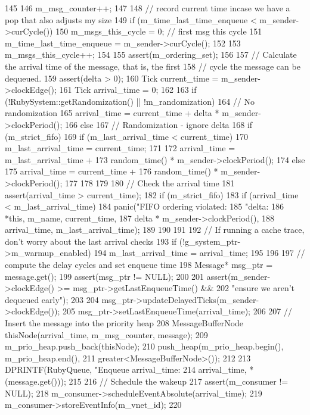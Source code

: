 \begin{DoxyCode}
145 {
146     m_msg_counter++;
147 
148     // record current time incase we have a pop that also adjusts my size
149     if (m_time_last_time_enqueue < m_sender->curCycle()) {
150         m_msgs_this_cycle = 0;  // first msg this cycle
151         m_time_last_time_enqueue = m_sender->curCycle();
152     }
153     m_msgs_this_cycle++;
154 
155     assert(m_ordering_set);
156 
157     // Calculate the arrival time of the message, that is, the first
158     // cycle the message can be dequeued.
159     assert(delta > 0);
160     Tick current_time = m_sender->clockEdge();
161     Tick arrival_time = 0;
162 
163     if (!RubySystem::getRandomization() || !m_randomization) {
164         // No randomization
165         arrival_time = current_time + delta * m_sender->clockPeriod();
166     } else {
167         // Randomization - ignore delta
168         if (m_strict_fifo) {
169             if (m_last_arrival_time < current_time) {
170                 m_last_arrival_time = current_time;
171             }
172             arrival_time = m_last_arrival_time +
173                            random_time() * m_sender->clockPeriod();
174         } else {
175             arrival_time = current_time +
176                            random_time() * m_sender->clockPeriod();
177         }
178     }
179 
180     // Check the arrival time
181     assert(arrival_time > current_time);
182     if (m_strict_fifo) {
183         if (arrival_time < m_last_arrival_time) {
184             panic("FIFO ordering violated: %
185                   "delta: %
186                   *this, m_name, current_time,
187                   delta * m_sender->clockPeriod(),
188                   arrival_time, m_last_arrival_time);
189         }
190     }
191 
192     // If running a cache trace, don't worry about the last arrival checks
193     if (!g_system_ptr->m_warmup_enabled) {
194         m_last_arrival_time = arrival_time;
195     }
196 
197     // compute the delay cycles and set enqueue time
198     Message* msg_ptr = message.get();
199     assert(msg_ptr != NULL);
200 
201     assert(m_sender->clockEdge() >= msg_ptr->getLastEnqueueTime() &&
202            "ensure we aren't dequeued early");
203 
204     msg_ptr->updateDelayedTicks(m_sender->clockEdge());
205     msg_ptr->setLastEnqueueTime(arrival_time);
206 
207     // Insert the message into the priority heap
208     MessageBufferNode thisNode(arrival_time, m_msg_counter, message);
209     m_prio_heap.push_back(thisNode);
210     push_heap(m_prio_heap.begin(), m_prio_heap.end(),
211         greater<MessageBufferNode>());
212 
213     DPRINTF(RubyQueue, "Enqueue arrival_time: %
214             arrival_time, *(message.get()));
215 
216     // Schedule the wakeup
217     assert(m_consumer != NULL);
218     m_consumer->scheduleEventAbsolute(arrival_time);
219     m_consumer->storeEventInfo(m_vnet_id);
220 }
\end{DoxyCode}
